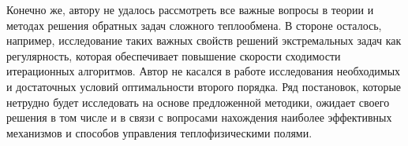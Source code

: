Конечно же, автору не удалось рассмотреть все важные вопросы в теории и
методах решения обратных задач сложного теплообмена.
В стороне осталось, например, исследование таких важных свойств решений экстремальных
задач как регулярность, которая обеспечивает повышение скорости
сходимости итерационных алгоритмов.
Автор не касался в работе исследования необходимых и достаточных условий
оптимальности второго порядка.
Ряд постановок, которые нетрудно будет исследовать на основе
предложенной методики, ожидает своего решения в том числе и в связи с
вопросами нахождения наиболее эффективных механизмов и способов
управления теплофизическими полями.
